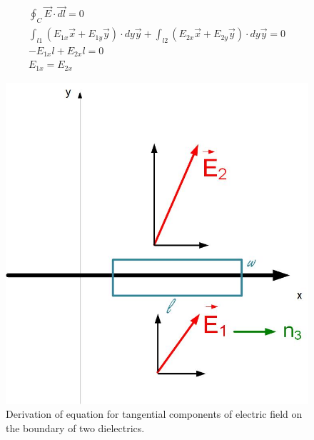 \documentclass{ximera}
\begin{document}
\begin{eqnarray}
\oint_C \vec{E} \cdot \vec{dl}=0 \\
\int_{l1} (E_{1x} \vec{x}+E_{1y} \vec{y}) \cdot dy \vec{y} +\int_{l2} (E_{2x} \vec{x}+E_{2y} \vec{y}) \cdot dy \vec{y} =0 \\
-E_{1x} l + E_{2x} l = 0 \\
E_{1x}  = E_{2x}
\end{eqnarray}


\begin{figure}[htbp]
\begin{center}
\includegraphics[scale=0.5]{../jpg/BoundaryConditionsTang.jpg}
\end{center}
\caption{Derivation of equation for tangential components of electric field on the boundary of two dielectrics.}
\label{fig:BoundaryConditionTangential}
\end{figure}
\end{document}
